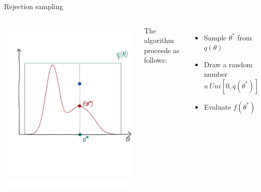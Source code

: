 \documentclass[compress]{beamer}
\begin{document}
\begin{frame}[label=sec-5-6]{Rejection sampling}
\begin{columns}[c] 
\includegraphics[width=.8\linewidth]{RS5.png}

The algorithm proceeds as follows:\\
\begin{itemize}
\item Sample $\theta^*$ from $q(\theta)$
\item Draw a random number $u ~ Uni[0, q(\theta^*)]$
\item Evaluate $f(\theta^*)$
\end{itemize}
\end{columns}
\end{frame}
\end{document}
